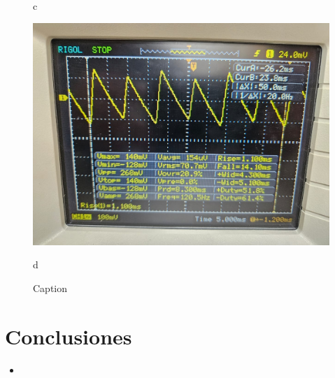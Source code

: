 \documentclass[10pt,letterpaper]{article}
\begin{document}
\begin{figure}[H]
\begin{minipage}[b]{0.45\textwidth}
        \caption*{c}
    \end{minipage}
    \begin{minipage}[b]{0.45\textwidth}
        \centering
        \includegraphics[scale=0.15]{Filtrado6.jpg}
        \caption*{d}
    \end{minipage}
    \caption{Caption}
    \label{fig:enter-label}
\end{figure}


\section{Conclusiones}
\begin{itemize}
	\item








\end{itemize}

\begin{thebibliography}{9}
\end{thebibliography}
\end{document}
